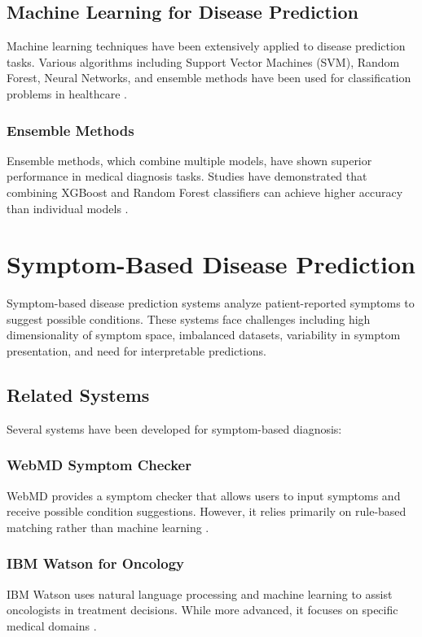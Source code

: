 \documentclass[12pt,a4paper]{article}
\begin{document}
\subsection{Machine Learning for Disease Prediction}
Machine learning techniques have been extensively applied to disease prediction tasks. Various algorithms including Support Vector Machines (SVM), Random Forest, Neural Networks, and ensemble methods have been used for classification problems in healthcare \cite{rajkomar2018machine}.

\subsubsection{Ensemble Methods}
Ensemble methods, which combine multiple models, have shown superior performance in medical diagnosis tasks. Studies have demonstrated that combining XGBoost and Random Forest classifiers can achieve higher accuracy than individual models \cite{chen2016xgboost}.

\section{Symptom-Based Disease Prediction}
Symptom-based disease prediction systems analyze patient-reported symptoms to suggest possible conditions. These systems face challenges including high dimensionality of symptom space, imbalanced datasets, variability in symptom presentation, and need for interpretable predictions.

\subsection{Related Systems}
Several systems have been developed for symptom-based diagnosis:

\subsubsection{WebMD Symptom Checker}
WebMD provides a symptom checker that allows users to input symptoms and receive possible condition suggestions. However, it relies primarily on rule-based matching rather than machine learning \cite{webmd}.

\subsubsection{IBM Watson for Oncology}
IBM Watson uses natural language processing and machine learning to assist oncologists in treatment decisions. While more advanced, it focuses on specific medical domains \cite{ibmwatson}.
\end{document}

